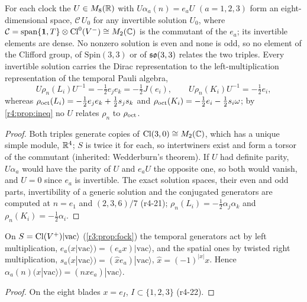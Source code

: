 \begin{theorem}
\label{r4:thm:conj}
For each clock the $U\in M_8(\mathbb{R})$ with $U\alpha_a(n)=e_aU$ $(a=1,2,3)$ form an eight-dimensional space, $\mathcal C\,U_0$ for any invertible
solution $U_0$, where $\mathcal C=\operatorname{span}\{\mathbf 1,T\}\otimes\mathrm{Cl}^0(V^-)\cong M_2(\mathbb{C})$ is the commutant of the $e_a$; its invertible elements are dense. No nonzero solution is even and none is odd, so no element of the Clifford group, of
$\mathrm{Spin}(3,3)$ or of $\mathfrak{so}(3,3)$ relates the two triples. Every invertible solution carries the Dirac representation to the left-multiplication
representation of the temporal Pauli algebra,
\[
U\rho_n(L_i)U^{-1}=-\tfrac12e_je_k=-\tfrac12J(e_i),\qquad U\rho_n(K_i)U^{-1}=-\tfrac12e_i ,
\]
whereas $\rho_{\rm oct}(L_i)=-\tfrac12e_je_k+\tfrac12s_js_k$ and $\rho_{\rm oct}(K_i)=-\tfrac12e_i-\tfrac12s_i\omega$; by \cref{r4:prop:ineq} no $U$ relates $\rho_n$ to $\rho_{\rm oct}$.
\end{theorem}

\begin{proof}
Both triples generate copies of $\mathrm{Cl}(3,0)\cong M_2(\mathbb{C})$, which has a unique simple module, $\mathbb{R}^4$; $S$ is twice it for each, so intertwiners exist and form
a torsor of the commutant (inherited: Wedderburn's theorem). If $U$ had definite parity, $U\alpha_a$ would have the parity of $U$ and $e_aU$ the
opposite one, so both would vanish, and $U=0$ since $e_a$ is invertible. The exact solution
spaces, their even and odd parts, invertibility of a generic solution and the conjugated generators are computed at $n=e_1$ and $(2,3,6)/7$ (r4-21);
$\rho_n(L_i)=-\tfrac12\alpha_j\alpha_k$ and $\rho_n(K_i)=-\tfrac12\alpha_i$.
\end{proof}

\begin{proposition}
\label{r4:prop:fockLR}
On $S=\mathrm{Cl}(V^+)|\mathrm{vac}\rangle$ (\cref{r3:prop:fock}) the temporal generators act by left multiplication, $e_a(x|\mathrm{vac}\rangle)=(e_ax)|\mathrm{vac}\rangle$, and the spatial ones by twisted
right multiplication, $s_a(x|\mathrm{vac}\rangle)=(\hat x e_a)|\mathrm{vac}\rangle$, $\hat x=(-1)^{|x|}x$. Hence $\alpha_a(n)(x|\mathrm{vac}\rangle)=(n\hat xe_a)|\mathrm{vac}\rangle$.
\end{proposition}

\begin{proof}
On the eight blades $x=e_I$, $I\subset\{1,2,3\}$ (r4-22).
\end{proof}

